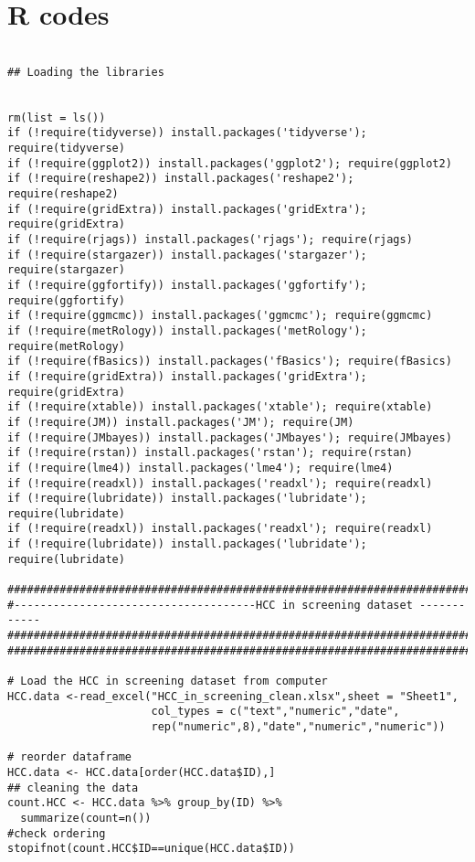 \documentclass[11pt,twoside]{article}
\numberwithin{Theorem}{section}
\numberwithin{Definition}{section}
\numberwithin{Lemma}{section}
\numberwithin{Algorithm}{section}
\numberwithin{equation}{section}
\begin{document}
\section*{R codes}
\begin{lstlisting}

## Loading the libraries


rm(list = ls())
if (!require(tidyverse)) install.packages('tidyverse'); require(tidyverse)
if (!require(ggplot2)) install.packages('ggplot2'); require(ggplot2)
if (!require(reshape2)) install.packages('reshape2'); require(reshape2)
if (!require(gridExtra)) install.packages('gridExtra'); require(gridExtra)
if (!require(rjags)) install.packages('rjags'); require(rjags)
if (!require(stargazer)) install.packages('stargazer'); require(stargazer)
if (!require(ggfortify)) install.packages('ggfortify'); require(ggfortify)
if (!require(ggmcmc)) install.packages('ggmcmc'); require(ggmcmc)
if (!require(metRology)) install.packages('metRology'); require(metRology)
if (!require(fBasics)) install.packages('fBasics'); require(fBasics)
if (!require(gridExtra)) install.packages('gridExtra'); require(gridExtra)
if (!require(xtable)) install.packages('xtable'); require(xtable)
if (!require(JM)) install.packages('JM'); require(JM)
if (!require(JMbayes)) install.packages('JMbayes'); require(JMbayes)
if (!require(rstan)) install.packages('rstan'); require(rstan)
if (!require(lme4)) install.packages('lme4'); require(lme4)
if (!require(readxl)) install.packages('readxl'); require(readxl)
if (!require(lubridate)) install.packages('lubridate'); require(lubridate)
if (!require(readxl)) install.packages('readxl'); require(readxl)
if (!require(lubridate)) install.packages('lubridate'); require(lubridate)

############################################################################
#-------------------------------------HCC in screening dataset ------------
############################################################################
############################################################################

# Load the HCC in screening dataset from computer
HCC.data <-read_excel("HCC_in_screening_clean.xlsx",sheet = "Sheet1",
                      col_types = c("text","numeric","date",
                      rep("numeric",8),"date","numeric","numeric"))

# reorder dataframe
HCC.data <- HCC.data[order(HCC.data$ID),]
## cleaning the data
count.HCC <- HCC.data %>% group_by(ID) %>%
  summarize(count=n())
#check ordering
stopifnot(count.HCC$ID==unique(HCC.data$ID))


\end{lstlisting}
\end{document}
